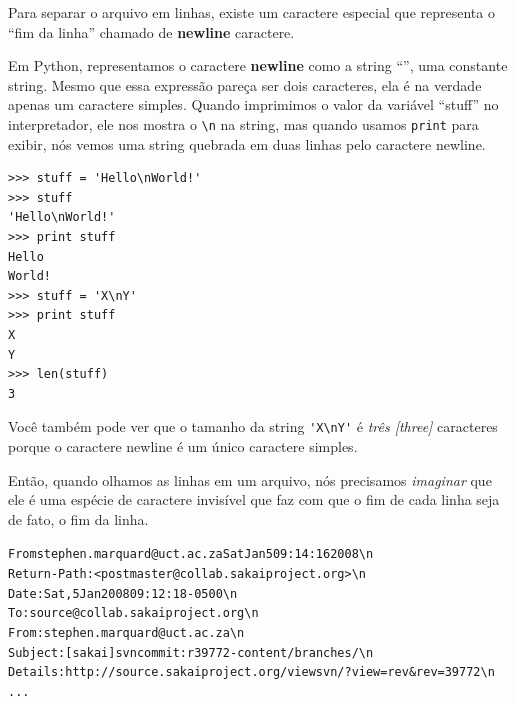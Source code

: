 Para separar o arquivo em linhas, existe um caractere especial que
representa o ``fim da linha'' chamado de {\bf newline} caractere.


Em Python, representamos o caractere {\bf newline} como a string ``\n'',
uma constante string. Mesmo que essa expressão pareça ser dois caracteres, ela
é na verdade apenas um caractere simples. Quando imprimimos o valor da variável
``stuff'' no interpretador, ele nos mostra o \verb"\n" na string,
mas quando usamos {\tt print} para exibir, nós vemos uma string quebrada
em duas linhas pelo caractere newline.

\beforeverb
\begin{verbatim}
>>> stuff = 'Hello\nWorld!'
>>> stuff
'Hello\nWorld!'
>>> print stuff
Hello
World!
>>> stuff = 'X\nY'
>>> print stuff
X
Y
>>> len(stuff)
3
\end{verbatim}
\afterverb

Você também pode ver que o tamanho da string \verb"'X\nY'" é \emph{três [three]}
caracteres porque o caractere newline é um único caractere simples.

Então, quando olhamos as linhas em um arquivo, nós precisamos \emph{imaginar}
que ele é uma espécie de caractere invisível que faz com que o fim de cada linha
seja de fato, o fim da linha.

 \beforeverb
 \begin{alltt}
 From stephen.marquard@uct.ac.za Sat Jan  5 09:14:16 2008\verb"\n"\\
 Return-Path: <postmaster@collab.sakaiproject.org>\verb"\n"\\
 Date: Sat, 5 Jan 2008 09:12:18 -0500\verb"\n"\\
 To: source@collab.sakaiproject.org\verb"\n"\\
 From: stephen.marquard@uct.ac.za\verb"\n"\\
 Subject: [sakai] svn commit: r39772 - content/branches/\verb"\n"\\
 Details: http://source.sakaiproject.org/viewsvn/?view=rev\&rev=39772\verb"\n"\\
 ...
 \end{alltt}
 \afterverb

